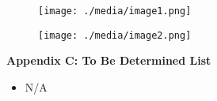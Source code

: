 \documentclass[12pt]{article}
\renewcommand{\_}{\kern-1.5pt\textunderscore\kern-1.5pt}
\begin{document}
\par





\begin{figure}[H]
	\begin{Center}
		\texttt{[image: ./media/image1.png]}
	\end{Center}
\end{figure}



\par



\begin{figure}[H]
	\begin{Center}
		\texttt{[image: ./media/image2.png]}
	\end{Center}
\end{figure}


\par

{\fontsize{14pt}{16.8pt}\selectfont \textbf{Appendix C: To Be Determined List}\par}\par

\begin{itemize}
	\item N/A 
\end{itemize}\par


\vspace{\baselineskip}

\vspace{\baselineskip}

\printbibliography
\end{document}
